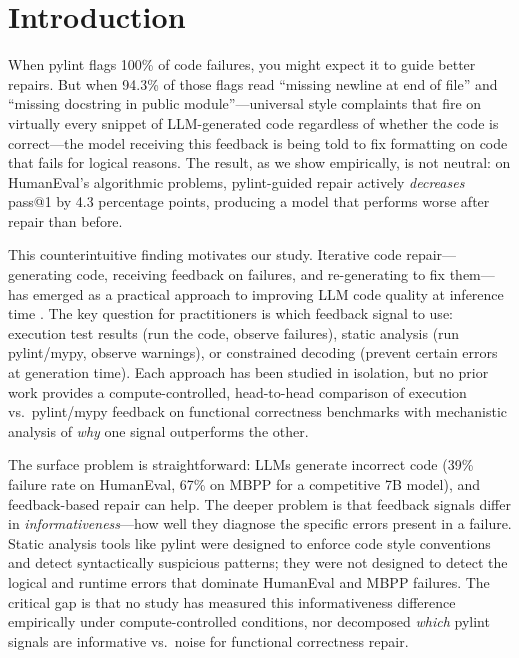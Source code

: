\section{Introduction}

When pylint flags 100\% of code failures, you might expect it to guide better repairs. But when 94.3\% of those flags read ``missing newline at end of file'' and ``missing docstring in public module''---universal style complaints that fire on virtually every snippet of LLM-generated code regardless of whether the code is correct---the model receiving this feedback is being told to fix formatting on code that fails for logical reasons. The result, as we show empirically, is not neutral: on HumanEval's algorithmic problems, pylint-guided repair actively \emph{decreases} pass@1 by 4.3 percentage points, producing a model that performs worse after repair than before.

This counterintuitive finding motivates our study. Iterative code repair---generating code, receiving feedback on failures, and re-generating to fix them---has emerged as a practical approach to improving LLM code quality at inference time \cite{Chen2023Teaching, Shinn2023Reflexion, Arimbur2026HowMany}. The key question for practitioners is which feedback signal to use: execution test results (run the code, observe failures), static analysis (run pylint/mypy, observe warnings), or constrained decoding (prevent certain errors at generation time). Each approach has been studied in isolation, but no prior work provides a compute-controlled, head-to-head comparison of execution vs.\ pylint/mypy feedback on functional correctness benchmarks with mechanistic analysis of \emph{why} one signal outperforms the other.

The surface problem is straightforward: LLMs generate incorrect code (39\% failure rate on HumanEval, 67\% on MBPP for a competitive 7B model), and feedback-based repair can help. The deeper problem is that feedback signals differ in \emph{informativeness}---how well they diagnose the specific errors present in a failure. Static analysis tools like pylint were designed to enforce code style conventions and detect syntactically suspicious patterns; they were not designed to detect the logical and runtime errors that dominate HumanEval and MBPP failures. The critical gap is that no study has measured this informativeness difference empirically under compute-controlled conditions, nor decomposed \emph{which} pylint signals are informative vs.\ noise for functional correctness repair.

